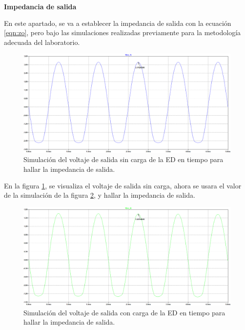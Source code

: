 \begin{enumerate}
        \textbf{Impedancia de salida}

        En este apartado, se va a establecer la impedancia de salida con la ecuación \ref{eqn:zo}, pero bajo las simulaciones realizadas previamente para la metodología adecuada del laboratorio.

        \begin{figure}[H]
          \centering
          \includegraphics[width=\textwidth]{Imagenes/vosc.png}
          \caption{Simulación del voltaje de salida sin carga de la ED en tiempo para hallar la impedancia de salida.}
          \label{fig:vo_sc_ed}
        \end{figure}

        En la figura \ref{fig:vo_sc_ed}, se visualiza el voltaje de salida sin carga, ahora se usara el valor de la simulación de la figura \ref{fig:vo_cc_ed}, y hallar la impedancia de salida.

        \begin{figure}[H]
          \centering
          \includegraphics[width=\textwidth]{Imagenes/vocc.png}
          \caption{Simulación del voltaje de salida con carga de la ED en tiempo para hallar la impedancia de salida.}
          \label{fig:vo_cc_ed}
        \end{figure}


\end{enumerate}
